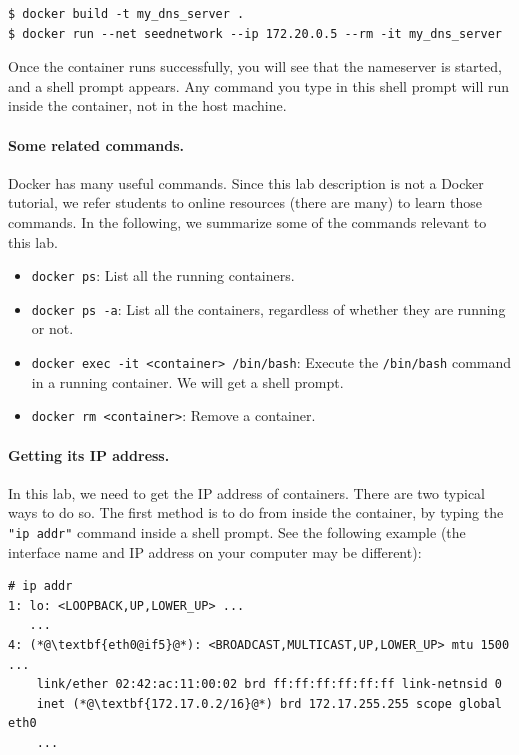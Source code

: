 \begin{lstlisting}
$ docker build -t my_dns_server .
$ docker run --net seednetwork --ip 172.20.0.5 --rm -it my_dns_server
\end{lstlisting}


Once the container runs successfully, you will see that the nameserver is started,
and a shell prompt appears. Any command you type in this shell prompt will
run inside the container, not in the host machine.  


\paragraph{Some related commands.} Docker has many useful commands. Since this lab
description is not a Docker tutorial, we refer students to online resources (there 
are many) to learn those commands. In the following, we 
summarize some of the commands relevant to this lab. 


\begin{itemize}
\item \texttt{docker ps}:  List all the running containers.
\item \texttt{docker ps -a}:  List all the containers, regardless of whether they are 
                              running or not.
\item \texttt{docker exec -it <container> /bin/bash}: Execute the \texttt{/bin/bash} command 
                              in a running container. We will get a shell prompt. 
\item \texttt{docker rm <container>}: Remove a container. 
\end{itemize}
 

\paragraph{Getting its IP address.}
In this lab, we need to get the IP address of containers. There are two typical ways
to do so. The first method is to do from inside the container, by typing 
the \texttt{"ip addr"} command inside a shell prompt. See the following example (the interface
name and IP address on your computer may be different): 

\begin{lstlisting}
# ip addr 
1: lo: <LOOPBACK,UP,LOWER_UP> ...
   ...
4: (*@\textbf{eth0@if5}@*): <BROADCAST,MULTICAST,UP,LOWER_UP> mtu 1500 ...
    link/ether 02:42:ac:11:00:02 brd ff:ff:ff:ff:ff:ff link-netnsid 0
    inet (*@\textbf{172.17.0.2/16}@*) brd 172.17.255.255 scope global eth0
    ...
\end{lstlisting}

